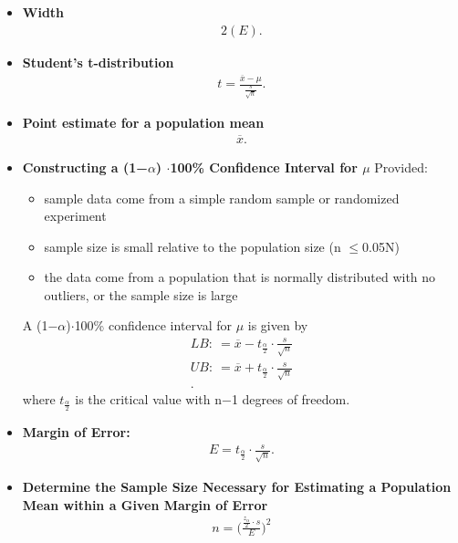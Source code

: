 \documentclass{report}
\begin{document}
\begin{itemize}
        \item \textbf{Width}
            \begin{align*}
                2(E)
            .\end{align*}
                \item \textbf{Student’s t-distribution}
            \begin{align*}
               t = \frac{\overline{x}-\mu}{\frac{s}{\sqrt{n}}} 
            .\end{align*}
          \item \textbf{Point estimate for a population mean}
            \begin{align*}
              \overline{x}
            .\end{align*}
        \item \textbf{Constructing a (1−$\alpha $) $ \cdot $100\% Confidence Interval for $\mu$}
            Provided:
            \begin{itemize}
                \item sample data come from a simple random sample or randomized experiment
                \item sample size is small relative to the population size (n $ \leq $0.05N)
                \item the data come from a population that is normally distributed with no outliers, or the sample size is large
            \end{itemize}
            A (1−$\alpha $)$\cdot$100\% confidence interval for $\mu$ is given by
            \begin{align*}
                LB:\ = \overline{x}  - t_{\frac{\alpha}{2}} \cdot \frac{s}{\sqrt{n}} \\
                UB:\ = \overline{x}  + t_{\frac{\alpha}{2}} \cdot \frac{s}{\sqrt{n}} \\
            .\end{align*}
            where $t_{\frac{\alpha}{2}} $ is the critical value with n−1 degrees of freedom.
        \item \textbf{Margin of Error:}
            \begin{align*}
                E = t_{\frac{\alpha}{2}} \cdot \frac{s}{\sqrt{n}}
            .\end{align*}
        \item \textbf{Determine the Sample Size Necessary for Estimating a Population Mean within a Given Margin of Error}
            \begin{align*}
                n = \bigg(\frac{\frac{z_{\alpha}}{2}\cdot s}{E}\bigg)^{2}

\end{align*}
\end{itemize}
\end{document}
